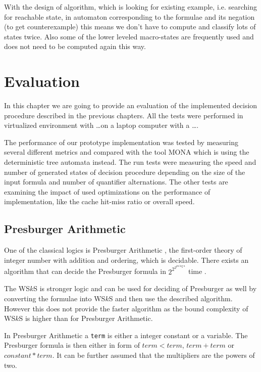  With the design of algorithm, which is looking for existing example, i.e.
 searching for reachable state, in automaton corresponding to the formulae and
 its negation (to get counterexample) this means we don't have to compute
 and classify lots of states twice. Also some of the lower leveled macro-states
 are frequently used and does not need to be computed again this way.

\chapter{Evaluation}

In this chapter we are going to provide an evaluation of the implemented
decision procedure described in the previous chapters. All the tests were
performed in virtualized environment with \ldots on a laptop computer with a
\ldots.

The performance of our prototype implementation was tested by measuring several
different metrics and compared with the tool \textsc{MONA} which is using the
deterministic tree automata instead. The run tests were measuring the speed and
number of generated states of decision procedure depending on the size of the
input formula and number of quantifier alternations. The other tests are
examining the impact of used optimizations on the performance of implementation,
like the cache hit-miss ratio or overall speed.

\iffalse
\section{Presburger Arithmetic}

One of the classical logics is Presburger Arithmetic \cite{pres}, the
first-order theory of integer number with addition and ordering, which is
decidable. There exists an algorithm that can decide the Presburger formula in
$2^{2^{2^{pn\log n}}}$ time \cite{pres-time}. 

The WS$k$S is stronger logic and can be used for deciding of Presburger as well
by converting the formulae into WS$k$S and then use the described algorithm.
However this does not provide the faster algorithm as the bound complexity of
WS$k$S is higher than for Presburger Arithmetic. 

In Presburger Arithmetic a \texttt{term} is either a integer constant or a
variable. The Presburger formula is then either in form of $term < term$, $term
+ term$ or $constant * term$. It can be further assumed that the multipliers
are the powers of two.

